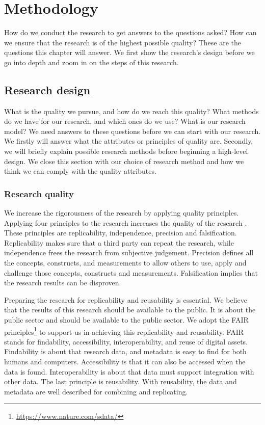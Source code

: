 \chapter{Methodology}
\label{ch:methodology}
How do we conduct the research to get answers to the questions asked? How can we ensure that the research is of the highest possible quality? These are the questions this chapter will answer. We first show the research's design before we go into depth and zoom in on the steps of this research.

\section{Research design}
\label{sec:researchquality}
What is the quality we pursue, and how do we reach this quality? What methods do we have for our research, and which ones do we use? What is our research model? We need answers to these questions before we can start with our research. We firstly will answer what the attributes or principles of quality are. Secondly, we will briefly explain possible research methods before beginning a high-level design. We close this section with our choice of research method and how we think we can comply with the quality attributes.

\subsection{Research quality}
\label{sub:researchquality}
We increase the rigorousness of the research by applying quality principles. Applying four principles to the research increases the quality of the research \parencite[p.~15--17]{Recker2012}. These principles are replicability, independence, precision and falsification. Replicability makes sure that a third party can repeat the research, while independence frees the research from subjective judgement. Precision defines all the concepts, constructs, and measurements to allow others to use, apply and challenge those concepts, constructs and measurements. Falsification implies that the research results can be disproven.

Preparing the research for replicability and reusability is essential. We believe that the results of this research should be available to the public. It is about the public sector and should be available to the public sector. We adopt the FAIR principles\footnote{\url{https://www.nature.com/sdata/}}  to support us in achieving this replicability and reusability. FAIR stands for findability, accessibility, interoperability, and reuse of digital assets. Findability is about that research data, and metadata is easy to find for both humans and computers. Accessibility is that it can also be accessed when the data is found. Interoperability is about that data must support integration with other data. The last principle is reusability. With reusability, the data and metadata are well described for combining and replicating.

